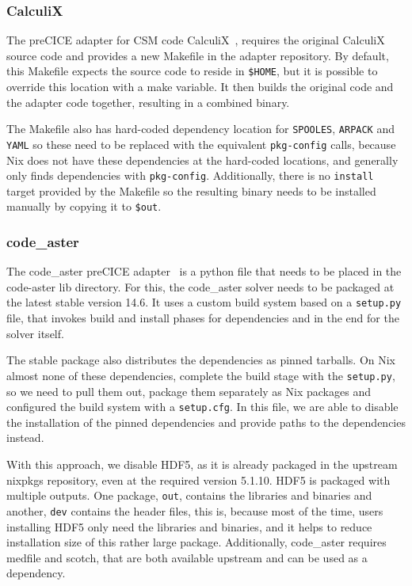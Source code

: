 \documentclass{eceasst}
\begin{document}
\subsubsection{CalculiX}

The preCICE adapter for CSM code CalculiX~\cite{Uekermann2017_Adapters}, requires the original CalculiX source code and provides a new Makefile in the adapter repository.
By default, this Makefile expects the source code to reside in \texttt{\$HOME}, but it is possible to override this location with a make variable.
It then builds the original code and the adapter code together, resulting in a combined binary.

The Makefile also has hard-coded dependency location for \texttt{SPOOLES}, \texttt{ARPACK} and \texttt{YAML} so these need to be replaced with the equivalent \texttt{pkg-config} calls, because Nix does not have these dependencies at the hard-coded locations, and generally only finds dependencies with \texttt{pkg-config}.
Additionally, there is no \texttt{install} target provided by the Makefile so the resulting binary needs to be installed manually by copying it to \texttt{\$out}.\\

\subsubsection{code\_aster}

The code\_aster preCICE adapter~\cite{Uekermann2017_Adapters} is a python file that needs to be placed in the code-aster lib directory.
For this, the code\_aster solver needs to be packaged at the latest stable version 14.6.
It uses a custom build system based on a \texttt{setup.py} file, that invokes build and install phases for dependencies and in the end for the solver itself.

The stable package also distributes the dependencies as pinned tarballs.
On Nix almost none of these dependencies, complete the build stage with the \texttt{setup.py}, so we need to pull them out, package them separately as Nix packages and configured the build system with a \texttt{setup.cfg}.
In this file, we are able to disable the installation of the pinned dependencies and provide paths to the dependencies instead.

With this approach, we disable HDF5, as it is already packaged in the upstream nixpkgs repository, even at the required version 5.1.10.
HDF5 is packaged with multiple outputs.
One package, \texttt{out}, contains the libraries and binaries and another, \texttt{dev} contains the header files, this is, because most of the time, users installing HDF5 only need the libraries and binaries, and it helps to reduce installation size of this rather large package.
Additionally, code\_aster requires medfile and scotch, that are both available upstream and can be used as a dependency.
\end{document}
